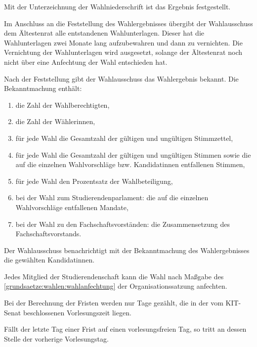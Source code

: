 \begin{jurdoc}
Mit der Unterzeichnung der Wahlniederschrift ist das Ergebnis festgestellt.

Im Anschluss an die Feststellung des Wahlergebnisses übergibt der Wahlausschuss dem Ältestenrat alle entstandenen Wahlunterlagen. Dieser hat die Wahlunterlagen zwei Monate lang aufzubewahren und dann zu vernichten. Die Vernichtung der Wahlunterlagen wird ausgesetzt, solange der Ältestenrat noch nicht über eine Anfechtung der Wahl entschieden hat.

\label{wahl:ergebnis}
Nach der Feststellung gibt der Wahlausschuss das Wahlergebnis bekannt. Die Bekanntmachung enthält: 
\begin{enumerate}
    \item die Zahl der Wahlberechtigten,
    \item die Zahl der Wählerinnen,
    \item für jede Wahl die Gesamtzahl der gültigen und ungültigen Stimmzettel,
    \item für jede Wahl die Gesamtzahl der gültigen und ungültigen Stimmen sowie die auf die einzelnen Wahlvorschläge bzw. Kandidatinnen entfallenen Stimmen,
    \item für jede Wahl den Prozentsatz der Wahlbeteiligung,
    \item bei der Wahl zum Studierendenparlament: die auf die einzelnen Wahlvorschläge entfallenen Mandate,
    \item bei der Wahl zu den Fachschaftsvorständen: die Zusammensetzung des Fachschaftsvorstands.
\end{enumerate}

Der Wahlausschuss benachrichtigt mit der Bekanntmachung des Wahlergebnisses die gewählten Kandidatinnen. 

\label{wahl:wahlanfechtung}
Jedes Mitglied der Studierendenschaft kann die Wahl nach Maßgabe des \ref{grundsaetze:wahlen:wahlanfechtung} der Organisationssatzung anfechten.

\label{wahl:fristen}
Bei der Berechnung der Fristen werden nur Tage gezählt, die in der vom KIT-Senat beschlossenen Vorlesungszeit liegen.

Fällt der letzte Tag einer Frist auf einen vorlesungsfreien Tag, so tritt an dessen Stelle der vorherige Vorlesungstag.

\end{jurdoc}
